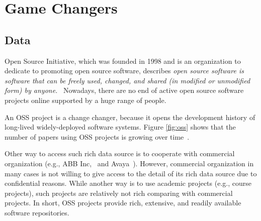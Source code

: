 \section{Game Changers} \label{game_changers}



\subsection{Data}
Open Source Initiative, which was founded in 1998 and is an organization to dedicate to promoting open source software, describes \emph{open source software is software that can be freely used, changed, and shared (in modified or unmodified form) by anyone.}~\cite{OSI}
Nowadays, there are no end of active open source software projects online supported by a huge range of people.

An OSS project is a change changer, because it opens the development history of long-lived widely-deployed software systems.
Figure \ref{fig:oss} shows that the number of papers using OSS projects is growing over time~\cite{Shihab2012PhD}. 

Other way to access such rich data source is to cooperate with commercial organization (e.g., ABB Inc,~\cite{Li2006} and Avaya~\cite{Mockus2010FSE}).
However, commercial organization in many cases is not willing to give access to the detail of its rich data source due to confidential reasons.
While another way is to use academic projects (e.g., course projects), such projects are relatively not rich comparing with commercial projects.
In short, OSS projects provide rich, extensive, and readily available software repositories. 



